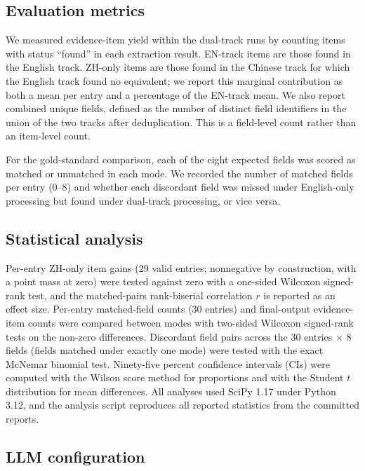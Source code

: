 \documentclass[preprint,12pt]{elsarticle}
\begin{document}
\subsection{Evaluation metrics}
\label{sec:metrics}

We measured evidence-item yield within the dual-track runs by counting
items with status ``found'' in each extraction result. EN-track items are
those found in the English track. ZH-only items are those found in the
Chinese track for which the English track found no equivalent; we report
this marginal contribution as both a mean per entry and a percentage of
the EN-track mean. We also report combined unique fields, defined as the
number of distinct field identifiers in the union of the two tracks
after deduplication. This is a field-level count rather than an item-level
count.

For the gold-standard comparison, each of the eight expected fields was
scored as matched or unmatched in each mode. We recorded the number of
matched fields per entry (0--8) and whether each discordant field was
missed under English-only processing but found under dual-track
processing, or vice versa.

\subsection{Statistical analysis}

Per-entry ZH-only item gains (29 valid entries; nonnegative by
construction, with a point mass at zero) were tested against zero with a
one-sided Wilcoxon signed-rank test, and the matched-pairs rank-biserial
correlation $r$ is reported as an effect size. Per-entry matched-field
counts (30 entries) and final-output evidence-item counts were compared
between modes with two-sided Wilcoxon signed-rank tests on the non-zero
differences. Discordant field pairs across the 30 entries $\times$ 8
fields (fields matched under exactly one mode) were tested with the exact
McNemar binomial test. Ninety-five percent confidence intervals (CIs)
were computed with the Wilson score method for proportions and with the
Student $t$ distribution for mean differences. All analyses used SciPy
1.17 under Python 3.12, and the analysis script
 reproduces all reported
statistics from the committed reports.

\subsection{LLM configuration}
\end{document}

